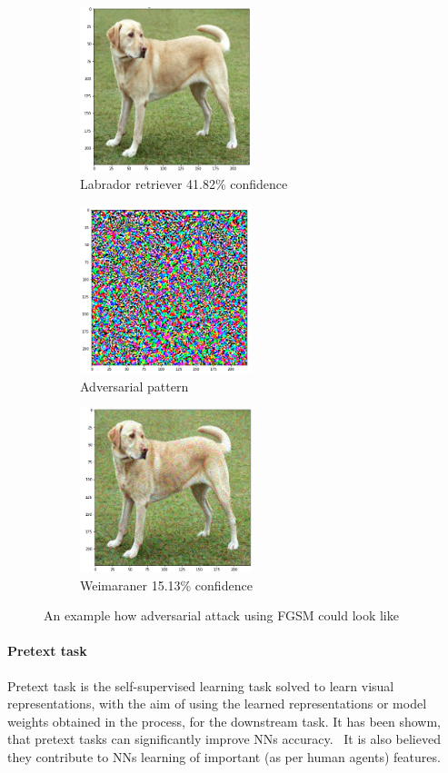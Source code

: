 \begin{figure}[h]
    \begin{subfigure}{0.33\textwidth}
        \caption{Labrador retriever 41.82\% confidence}
        \includegraphics[width=5cm]{images/labrador}
    \end{subfigure}
    \begin{subfigure}{0.33\textwidth}
        \caption{Adversarial pattern}
        \includegraphics[width=5cm]{images/adv_pattern}
    \end{subfigure}
    \begin{subfigure}{0.3\textwidth}
        \caption{Weimaraner 15.13\% confidence}
        \includegraphics[width=5cm]{images/adv_labrador}
    \end{subfigure}
    \caption{An example how adversarial attack using FGSM could look like}
\end{figure}

\paragraph{Pretext task}
Pretext task is the self-supervised learning task solved to learn visual representations,
with the aim of using the learned representations or model weights obtained in the process, for the downstream task.
It has been showm, that pretext tasks can significantly improve NNs accuracy.~\cite{kolesnikov2019revisiting}
It is also believed they contribute to NNs learning of important (as per human agents) features.

